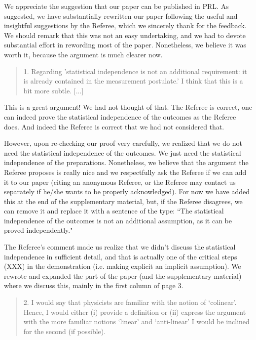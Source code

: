 \documentclass[11pt]{article}
\begin{document}
We appreciate the suggestion that our paper can be published in
PRL. As suggested, we have substantially rewritten our paper following
the useful and insightful suggestions by the Referee, which we
sincerely thank for the feedback. We should remark that this was not
an easy undertaking, and we had to devote substantial effort in
rewording most of the paper. Nonetheless, we believe it was worth it,
because the argument is much clearer now.

\begin{quote}
1. Regarding 'statistical independence is not an
additional requirement: it is already contained in the measurement
postulate.' I think that this is a bit more subtle. [...]
\end{quote}

This is a great argument! We had not thought of that. The Referee is
correct, one can indeed prove the statistical independence of the
outcomes as the Referee does. And indeed the Referee is correct that
we had not considered that.

However, upon re-checking our proof very carefully, we realized that
we do not need the statistical independence of the outcomes. We just
need the statistical independence of the preparations. Nonetheless, we
believe that the argument the Referee proposes is really nice and we
respectfully ask the Referee if we can add it to our paper (citing an
anonymous Referee, or the Referee may contact us separately if he/she
wants to be properly acknowledged). For now we have added this at the end of the
supplementary material, but, if the Referee disagrees, we can remove
it and replace it with a sentence of the type: ``The statistical
independence of the outcomes is not an additional assumption, as it
can be proved independently."

The Referee's comment made us realize that we didn't discuss the
statistical independence in sufficient detail, and that is actually
one of the critical steps (XXX) in the demonstration (i.e. making explicit an
implicit assumption). We rewrote and expanded the part of the paper
(and the supplementary material) where we discuss this, mainly in the
first column of page 3.

\begin{quote}
2. I would say that physicists are familiar with the
notion of `colinear'.  Hence, I would either (i) provide a definition
or (ii) express the argument with the more familiar notions `linear'
and `anti-linear' I would be inclined for the second (if possible).
\end{quote}
\end{document}
